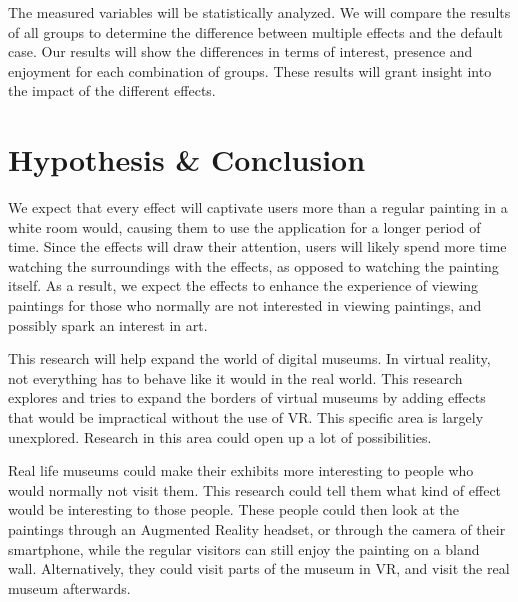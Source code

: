 \documentclass[a4paper]{article}
\begin{document}
The measured variables will be statistically analyzed. We will compare the results of all groups to determine the difference between multiple effects and the default case. Our results will show the differences in terms of interest, presence and enjoyment for each combination of groups. These results will grant insight into the impact of the different effects.


\section {Hypothesis \& Conclusion}
We expect that every effect will captivate users more than a regular painting in a white room would, causing them to use the application for a longer period of time. Since the effects will draw their attention, users will likely spend more time watching the surroundings with the effects, as opposed to watching the painting itself. As a result, we expect the effects to enhance the experience of viewing paintings for those who normally are not interested in viewing paintings, and possibly spark an interest in art.

This research will help expand the world of digital museums. In virtual reality, not everything has to behave like it would in the real world. This research explores and tries to expand the borders of virtual museums by adding effects that would be impractical without the use of VR. This specific area is largely unexplored. Research in this area could open up a lot of possibilities.

Real life museums could make their exhibits more interesting to people who would normally not visit them. This research could tell them what kind of effect would be interesting to those people. These people could then look at the paintings through an Augmented Reality headset, or through the camera of their smartphone, while the regular visitors can still enjoy the painting on a bland wall. Alternatively, they could visit parts of the museum in VR, and visit the real museum afterwards.
\end{document}
